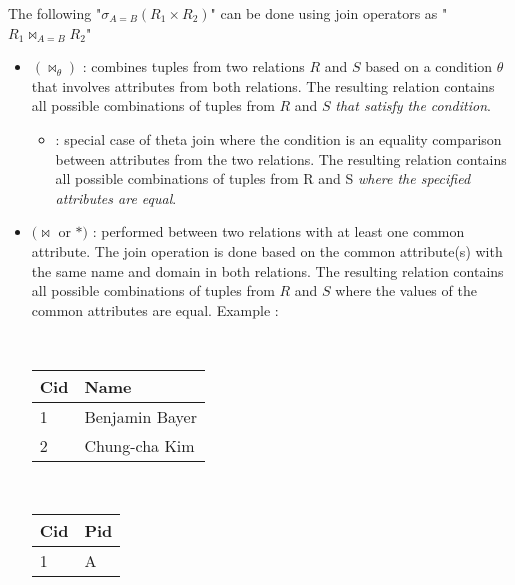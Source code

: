 The following "$\sigma_{A=B}(R_1 \times R_2)$" can be done using join operators as "$R_1 \bowtie_{A=B} R_2$"

\begin{itemize}
    \item {} $(\bowtie_{\theta})$ : combines tuples from two relations $R$ and $S$ based on a condition $\theta$ that involves attributes from both relations. The resulting relation contains all possible combinations of tuples from $R$ and $S$ \textit{that satisfy the condition}.
    \begin{itemize}
        \item {} : special case of theta join where the condition is an equality comparison between attributes from the two relations. The resulting relation contains all possible combinations of tuples from R and S \textit{where the specified attributes are equal}.
    \end{itemize}
    \item {} $(\bowtie$ or $*)$ : performed between two relations with at least one common attribute. The join operation is done based on the common attribute(s) with the same name and domain in both relations. The resulting relation contains all possible combinations of tuples from $R$ and $S$ where the values of the common attributes are equal. Example :\\
    \begin{minipage}[t]{0.31\textwidth}
        \begin{center}
        \\
	    \begin{tabular}{|l|l|}
	    \hline 
	    Cid & Name \\ 
	    \hline 
	    \hline 
	    1 & Benjamin Bayer \\ 
	    \hline 
	    2 & Chung-cha Kim \\ 
	    \hline 
	    \end{tabular}
        \end{center}
    \end{minipage}
    \begin{minipage}[t]{0.31\textwidth}
        \begin{center}
        \\
	    \begin{tabular}{|l|l|}
	    \hline 
	    Cid & Pid \\ 
	    \hline 
	    \hline 
	    1 & A \\ 

\end{tabular}
\end{center}
\end{minipage}
\end{itemize}
